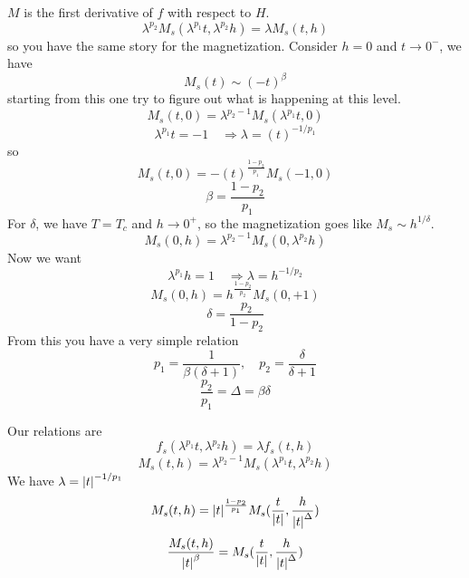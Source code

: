 \documentclass[../main/main.tex]{subfiles}
\begin{document}
\( M \) is the first derivative of \( f \) with respect to \( H \).
\begin{equation}
  \lambda ^{p_2} M_s ( \lambda ^{p_1} t, \lambda ^{p_2} h) = \lambda M_s (t,h)
\end{equation}
so you have the same story for the magnetization.
Consider \( h=0 \) and \( t \rightarrow 0^- \), we have
\begin{equation}
  M_s (t) \sim (-t)^{\beta }
\end{equation}
starting from this one try to figure out what is happening at this level.
\begin{equation}
  M_s (t,0) = \lambda ^{p_2 -1} M_s ( \lambda ^{p_1} t,0)
\end{equation}
\begin{equation}
  \lambda ^{p_1} t = -1 \quad \Rightarrow \lambda = (t)^{-1/p_1}
\end{equation}
so
\begin{equation}
  M_s (t,0) = - (t)^{\frac{1-p_2}{p_1}} M_s (-1,0)
\end{equation}
\begin{equation}
  \beta = \frac{1-p_2}{p_1}
\end{equation}
For \( \delta  \), we have  \( T=T_c \) and \( h \rightarrow 0^+ \), so the magnetization goes like \( M_s \sim h^{1/\delta } \).
\begin{equation}
  M_s (0,h) = \lambda ^{p_2 - 1} M_s (0,\lambda ^{p_2} h)
\end{equation}
Now we want
\begin{equation}
  \lambda ^{p_1} h = 1 \quad \Rightarrow \lambda = h ^{-1/p_2}
\end{equation}
\begin{equation}
  M_s (0,h) = h ^{\frac{1-p_2}{p_2}} M_s (0,+1)
\end{equation}
\begin{equation}
  \delta = \frac{p_2}{ 1 - p_2 }
\end{equation}
From this you have a very simple relation
\begin{equation}
  p_1 = \frac{1}{\beta (\delta +1)}, \quad p_2 = \frac{\delta }{\delta + 1}
\end{equation}
\begin{equation}
  \frac{p_2}{p_1} = \Delta = \beta \delta
\end{equation}

Our relations are
\begin{equation}
  f_s (\lambda ^{p_1} t, \lambda ^{p_2} h) = \lambda f_s (t,h)
\end{equation}
\begin{equation}
  M_s (t,h) = \lambda ^{p_2 - 1} M_s (\lambda ^{p_1} t, \lambda ^{p_2} h)
\end{equation}
We have \( \lambda = \abs{t}^{-1/p_1}  \)
\begin{equation}
  M_s (t,h) = \abs{t}^{\frac{1-p_2}{p_1}} M_s ( \frac{t}{\abs{t} }, \frac{h}{\abs{t}^{\Delta } })
\end{equation}
\begin{equation}
  \frac{M_s (t,h)}{\abs{t}^{\beta } } = M_s ( \frac{t}{\abs{t} }, \frac{h}{\abs{t}^{\Delta } })
\end{equation}
\end{document}
